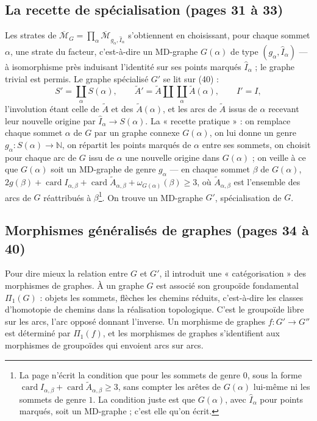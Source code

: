 \documentclass[11pt,a4paper]{article}
\begin{document}
\subsection*{La recette de spécialisation (pages 31 à 33)}

Les strates de $\overline{\mathcal{M}}_G = \prod_\alpha
\overline{\mathcal{M}}_{g_\alpha, \widehat{I}_\alpha}$ s'obtiennent en choisissant,
pour chaque sommet $\alpha$, une strate du facteur, c'est-à-dire un MD-graphe
$G(\alpha)$ de type $(g_\alpha, \widehat{I}_\alpha)$ — à isomorphisme près
induisant l'identité sur ses points marqués $\widehat{I}_\alpha$ ; le graphe
trivial est permis. Le graphe spécialisé $G'$ se lit sur (40) :
\[
S' = \coprod_\alpha S(\alpha), \qquad \widetilde{A}' = \widetilde{A} \amalg
\coprod_\alpha \widetilde{A}(\alpha), \qquad I' = I,
\]
l'involution étant celle de $\widetilde{A}$ et des $\widetilde{A}(\alpha)$, et
les arcs de $\widetilde{A}$ issus de $\alpha$ recevant leur nouvelle origine par
$\widehat{I}_\alpha \to S(\alpha)$. La « recette pratique » : on remplace chaque
sommet $\alpha$ de $G$ par un graphe connexe $G(\alpha)$, on lui donne un genre
$g_\alpha : S(\alpha) \to \mathbb{N}$, on répartit les points marqués de $\alpha$
entre ses sommets, on choisit pour chaque arc de $G$ issu de $\alpha$ une
nouvelle origine dans $G(\alpha)$ ; on veille à ce que $G(\alpha)$ soit un
MD-graphe de genre $g_\alpha$ — en chaque sommet $\beta$ de $G(\alpha)$, $2g(\beta)
+ \operatorname{card} I_{\alpha,\beta} + \operatorname{card}
\widetilde{A}_{\alpha,\beta} + \omega_{G(\alpha)}(\beta) \geq 3$, où
$\widetilde{A}_{\alpha,\beta}$ est l'ensemble des arcs de $G$ réattribués à
$\beta$\footnote{La page n'écrit la condition que pour les sommets de genre $0$,
sous la forme $\operatorname{card} I_{\alpha,\beta} + \operatorname{card}
\widetilde{A}_{\alpha,\beta} \geq 3$, sans compter les arêtes de $G(\alpha)$
lui-même ni les sommets de genre $1$. La condition juste est que $G(\alpha)$,
avec $\widehat{I}_\alpha$ pour points marqués, soit un MD-graphe ; c'est elle
qu'on écrit.}. On trouve un MD-graphe $G'$, spécialisation de $G$.

\subsection*{Morphismes généralisés de graphes (pages 34 à 40)}

Pour dire mieux la relation entre $G$ et $G'$, il introduit une
« catégorisation » des morphismes de graphes. À un graphe $G$ est associé son
groupoïde fondamental $\Pi_1(G)$ : objets les sommets, flèches les chemins
réduits, c'est-à-dire les classes d'homotopie de chemins dans la réalisation
topologique. C'est le groupoïde libre sur les arcs, l'arc opposé donnant
l'inverse. Un morphisme de graphes $f : G' \to G''$ est déterminé par $\Pi_1(f)$,
et les morphismes de graphes s'identifient aux morphismes de groupoïdes qui
envoient arcs sur arcs.
\end{document}

